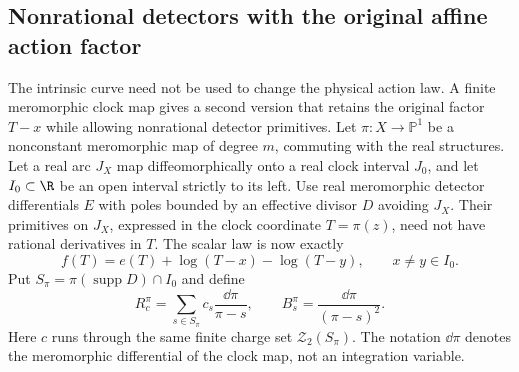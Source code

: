 \subsection{Nonrational detectors with the original affine action factor}
The intrinsic curve need not be used to change the physical action law.
A finite meromorphic clock map gives a second version that retains the
original factor $T-x$ while allowing nonrational detector primitives.
Let $\pi:X\to\mathbb P^1$ be a nonconstant meromorphic map of degree
$m$, commuting with the real structures. Let a real arc $J_X$ map
diffeomorphically onto a real clock interval $J_0$, and let
$I_0\subset\R$ be an open interval strictly to its left. Use real
meromorphic detector differentials $E$ with poles bounded by an effective
divisor $D$ avoiding $J_X$. Their primitives on $J_X$, expressed in the
clock coordinate $T=\pi(z)$, need not have rational derivatives in $T$.
The scalar law is now exactly
\[
                   f(T)=e(T)+\log(T-x)-\log(T-y),
                  \qquad x\ne y\in I_0.
\]
Put $S_\pi=\pi(\operatorname{supp}D)\cap I_0$ and define
\[
 R_c^\pi=\sum_{s\in S_\pi}c_s\frac{\dd\pi}{\pi-s},\qquad
 B_s^\pi=\frac{\dd\pi}{(\pi-s)^2}.
\]
Here $c$ runs through the same finite charge set $\mathcal Z_2(S_\pi)$.
The notation $\dd\pi$ denotes the meromorphic differential of the
clock map, not an integration variable.

